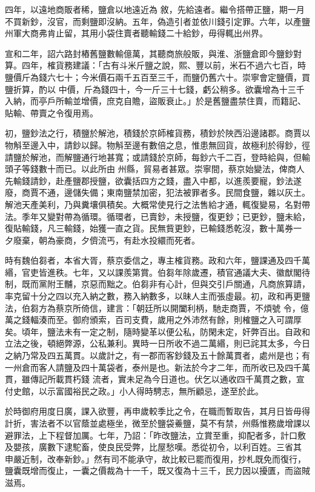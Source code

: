\begin{pinyinscope}
 四年，以遠地商販者稀，鹽倉以地遠近為
 敘，先給遠者。繼令搭帶正鹽，期一月不買新鈔，沒官，而剩鹽即沒納。五年，偽造引者並依川錢引定罪。六年，以產鹽州軍大商弗肯止留，其用小袋住賣者聽輸錢二十給鈔，毋得輒出州界。



 宣和二年，詔六路封樁舊鹽數輸億萬，其聽商旅般販，與淮、浙鹽倉即今鹽鈔對算。四年，榷貨務建議：「古有斗米斤鹽之說，熙、豐以前，米石不過六七百，時鹽價斤為錢六七十；今米價石兩千五百至三千，而鹽仍舊六十。崇寧會定鹽價，買鹽折算，酌以
 中價，斤為錢四十，今一斤三十七錢，虧公稍多。欲囊增為十三千入納，而亭戶所輸並增價，庶克自贍，盜販衰止。」於是舊鹽盡禁住賣，而籍記、貼輸、帶賣之令復用焉。



 初，鹽鈔法之行，積鹽於解池，積錢於京師榷貨務，積鈔於陜西沿邊諸郡。商賈以物斛至邊入中，請鈔以歸。物斛至邊有數倍之息，惟患無回貨，故極利於得鈔，徑請鹽於解池，而解鹽通行地甚寬；或請錢於京師，每鈔六千二百，登時給與，但輸頭子等錢數十而已。以此所由
 州縣，貿易者甚眾。崇寧間，蔡京始變法，俾商人先輸錢請鈔，赴產鹽郡授鹽，欲囊括四方之錢，盡入中都，以進羨要寵，鈔法遂廢，商賈不通，邊儲失備；東南鹽禁加密，犯法被罪者多。民間食鹽，雜以灰土。解池天產美利，乃與糞壤俱積矣。大概常使見行之法售給才通，輒復變易，名對帶法。季年又變對帶為循環。循環者，已賣鈔，未授鹽，復更鈔；已更鈔，鹽未給，復貼輸錢，凡三輸錢，始獲一直之貨。民無貲更鈔，已輸錢悉乾沒，數十萬券一
 夕廢棄，朝為豪商，夕儕流丐，有赴水投繯而死者。



 時有魏伯芻者，本省大胥，蔡京委信之，專主榷貨務。政和六年，鹽課通及四千萬緡，官吏皆進秩。七年，又以課羨第賞。伯芻年除歲遷，積官通議大夫、徽猷閣待制，既而黨附王黼，京惡而黜之。伯芻非有心計，但與交引戶關通，凡商旅算請，率克留十分之四以充入納之數，務入納數多，以昧人主而張虛最。初，政和再更鹽法，伯芻方為蔡京所倚信，建言：「朝廷所以開闔利柄，馳走商賈，不煩號
 令，億萬之錢輻湊而至。御府頒索，百司支費，歲用之外沛然有餘，則榷鹽之入可謂厚矣。頃年，鹽法未有一定之制，隨時變革以便公私，防閑未定，奸弊百出。自政和立法之後，頓絕弊源，公私兼利。異時一日所收不過二萬緡，則已詫其太多，今日之納乃常及四五萬貫。以歲計之，有一郡而客鈔錢及五十餘萬貫者，處州是也；有一州倉而客人請鹽及四十萬袋者，泰州是也。新法於今才二年，而所收已及四千萬貫，雖傳記所載貫朽錢
 流者，實未足為今日道也。伏乞以通收四千萬貫之數，宣付史館，以示富國裕民之政。」小人得時騁志，無所顧忌，遂至於此。



 於時御府用度日廣，課入欲豐，再申歲較季比之令，在職而暫取告，其月日皆毋得計折，害法者不以官蔭並處極坐，微至於鹽袋鯗鹽，莫不有禁，州縣惟務歲增課以避罪法，上下程督加厲。七年，乃詔：「昨改鹽法，立賞至重，抑配者多，計口敷及嬰孩，廣數下逮駝畜，使良民受弊，比屋愁嘆。悉從初令，以利百姓。三省其
 申嚴近制，改奉新鈔。」然有司不能承守，故比較已罷而復用，抄札既免而復行，鹽囊既增而復止，一囊之價裁為十一千，既又復為十三千，民力因以擾匱，而盜賊滋焉。




\end{pinyinscope}
